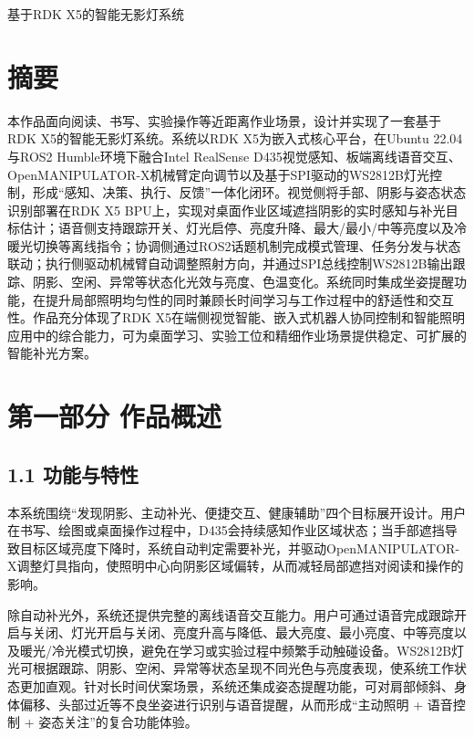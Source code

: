 \documentclass[UTF8,a4paper,zihao=-4]{ctexart}
\begin{document}
\begin{center}
{\fontsize{18pt}{22pt}\selectfont 基于RDK X5的智能无影灯系统}
\end{center}

\section*{摘要}

本作品面向阅读、书写、实验操作等近距离作业场景，设计并实现了一套基于RDK X5的智能无影灯系统。系统以RDK X5为嵌入式核心平台，在Ubuntu 22.04与ROS2 Humble环境下融合Intel RealSense D435视觉感知、板端离线语音交互、OpenMANIPULATOR-X机械臂定向调节以及基于SPI驱动的WS2812B灯光控制，形成“感知、决策、执行、反馈”一体化闭环。视觉侧将手部、阴影与姿态状态识别部署在RDK X5 BPU上，实现对桌面作业区域遮挡阴影的实时感知与补光目标估计；语音侧支持跟踪开关、灯光启停、亮度升降、最大/最小/中等亮度以及冷暖光切换等离线指令；协调侧通过ROS2话题机制完成模式管理、任务分发与状态联动；执行侧驱动机械臂自动调整照射方向，并通过SPI总线控制WS2812B输出跟踪、阴影、空闲、异常等状态化光效与亮度、色温变化。系统同时集成坐姿提醒功能，在提升局部照明均匀性的同时兼顾长时间学习与工作过程中的舒适性和交互性。作品充分体现了RDK X5在端侧视觉智能、嵌入式机器人协同控制和智能照明应用中的综合能力，可为桌面学习、实验工位和精细作业场景提供稳定、可扩展的智能补光方案。

\section*{第一部分 作品概述}

\subsection*{1.1 功能与特性}

本系统围绕“发现阴影、主动补光、便捷交互、健康辅助”四个目标展开设计。用户在书写、绘图或桌面操作过程中，D435会持续感知作业区域状态；当手部遮挡导致目标区域亮度下降时，系统自动判定需要补光，并驱动OpenMANIPULATOR-X调整灯具指向，使照明中心向阴影区域偏转，从而减轻局部遮挡对阅读和操作的影响。

除自动补光外，系统还提供完整的离线语音交互能力。用户可通过语音完成跟踪开启与关闭、灯光开启与关闭、亮度升高与降低、最大亮度、最小亮度、中等亮度以及暖光/冷光模式切换，避免在学习或实验过程中频繁手动触碰设备。WS2812B灯光可根据跟踪、阴影、空闲、异常等状态呈现不同光色与亮度表现，使系统工作状态更加直观。针对长时间伏案场景，系统还集成姿态提醒功能，可对肩部倾斜、身体偏移、头部过近等不良坐姿进行识别与语音提醒，从而形成“主动照明 + 语音控制 + 姿态关注”的复合功能体验。
\end{document}
